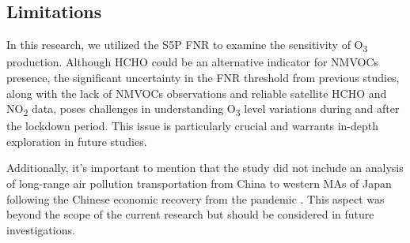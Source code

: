 \subsection{Limitations}
In this research, we utilized the S5P FNR to examine the sensitivity of O\textsubscript{3} production. Although HCHO could be an alternative indicator for NMVOCs presence, the significant uncertainty in the FNR threshold from previous studies, along with the lack of NMVOCs observations and reliable satellite HCHO and NO\textsubscript{2} data, poses challenges in understanding O\textsubscript{3} level variations during and after the lockdown period. This issue is particularly crucial and warrants in-depth exploration in future studies. \par
Additionally, it's important to mention that the study did not include an analysis of long-range air pollution transportation from China to western MAs of Japan following the Chinese economic recovery from the pandemic \citep{itahashi2022returning}. This aspect was beyond the scope of the current research but should be considered in future investigations. \par

